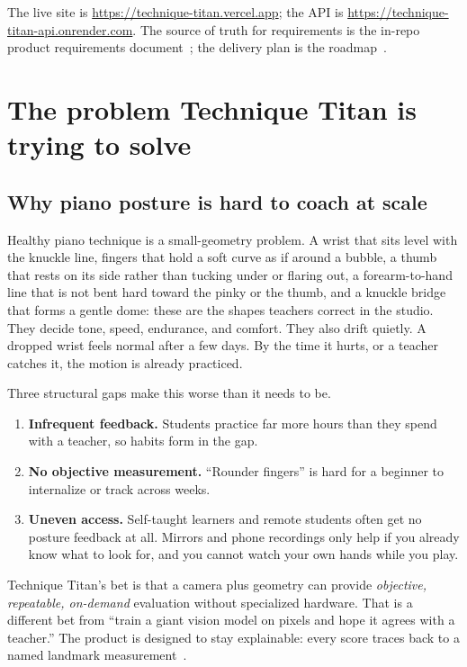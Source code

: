 \documentclass[11pt,a4paper]{article}
\newcommand{\tturl}[1]{\url{#1}}
\begin{document}
The live site is \tturl{https://technique-titan.vercel.app};
the API is \tturl{https://technique-titan-api.onrender.com}.
The source of truth for requirements is the in-repo product requirements document~\cite{prd}; the delivery plan is the roadmap~\cite{roadmap}.

\section{The problem Technique Titan is trying to solve}

\subsection{Why piano posture is hard to coach at scale}

Healthy piano technique is a small-geometry problem.
A wrist that sits level with the knuckle line, fingers that hold a soft curve as if around a bubble, a thumb that rests on its side rather than tucking under or flaring out, a forearm-to-hand line that is not bent hard toward the pinky or the thumb, and a knuckle bridge that forms a gentle dome: these are the shapes teachers correct in the studio.
They decide tone, speed, endurance, and comfort.
They also drift quietly.
A dropped wrist feels normal after a few days.
By the time it hurts, or a teacher catches it, the motion is already practiced.

Three structural gaps make this worse than it needs to be.

\begin{enumerate}
  \item \textbf{Infrequent feedback.} Students practice far more hours than they spend with a teacher, so habits form in the gap.
  \item \textbf{No objective measurement.} \enquote{Rounder fingers} is hard for a beginner to internalize or track across weeks.
  \item \textbf{Uneven access.} Self-taught learners and remote students often get no posture feedback at all. Mirrors and phone recordings only help if you already know what to look for, and you cannot watch your own hands while you play.
\end{enumerate}

Technique Titan's bet is that a camera plus geometry can provide \emph{objective, repeatable, on-demand} evaluation without specialized hardware.
That is a different bet from \enquote{train a giant vision model on pixels and hope it agrees with a teacher.}
The product is designed to stay explainable: every score traces back to a named landmark measurement~\cite{scoringmethods}.
\end{document}
